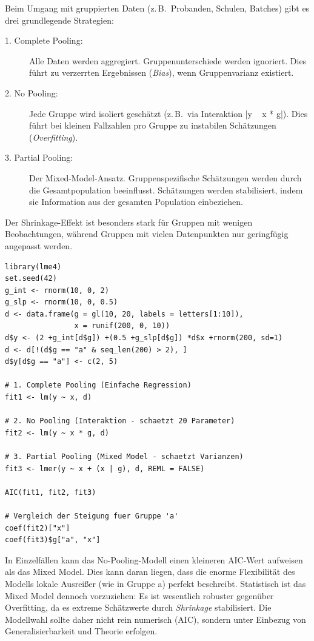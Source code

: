 \documentclass[10pt,twocolumn]{scrartcl}
\renewcommand{\lstinline}{\mycoloredinline}
\begin{document}
Beim Umgang mit gruppierten Daten (z.\,B.\ Probanden, Schulen, Batches) gibt es drei grundlegende Strategien:

\begin{description}
\item[1. Complete Pooling:] Alle Daten werden aggregiert. Gruppenunterschiede werden ignoriert. Dies führt zu verzerrten Ergebnissen (\emph{Bias}), wenn Gruppenvarianz existiert.
\item[2. No Pooling:] Jede Gruppe wird isoliert geschätzt (z.\,B.\ via Interaktion \lstinline|y ~ x * g|). Dies führt bei kleinen Fallzahlen pro Gruppe zu instabilen Schätzungen (\emph{Overfitting}).
\item[3. Partial Pooling:] Der Mixed-Model-Ansatz. Gruppenspezifische Schätzungen werden durch die Gesamtpopulation beeinflusst. Schätzungen werden stabilisiert, indem sie Information aus der gesamten Population einbeziehen.
\end{description}

Der Shrinkage-Effekt ist besonders stark für Gruppen mit wenigen Beobachtungen, während Gruppen mit vielen Datenpunkten nur geringfügig angepasst werden.

\begin{lstlisting}
library(lme4)
set.seed(42)
g_int <- rnorm(10, 0, 2)
g_slp <- rnorm(10, 0, 0.5)
d <- data.frame(g = gl(10, 20, labels = letters[1:10]), 
                x = runif(200, 0, 10))
d$y <- (2 +g_int[d$g]) +(0.5 +g_slp[d$g]) *d$x +rnorm(200, sd=1)
d <- d[!(d$g == "a" & seq_len(200) > 2), ]
d$y[d$g == "a"] <- c(2, 5)

# 1. Complete Pooling (Einfache Regression)
fit1 <- lm(y ~ x, d)

# 2. No Pooling (Interaktion - schaetzt 20 Parameter)
fit2 <- lm(y ~ x * g, d)

# 3. Partial Pooling (Mixed Model - schaetzt Varianzen)
fit3 <- lmer(y ~ x + (x | g), d, REML = FALSE)

AIC(fit1, fit2, fit3)

# Vergleich der Steigung fuer Gruppe 'a'
coef(fit2)["x"]
coef(fit3)$g["a", "x"]
\end{lstlisting}

In Einzelfällen kann das No-Pooling-Modell einen kleineren AIC-Wert aufweisen als das Mixed Model. Dies kann daran liegen, dass die enorme Flexibilität des Modells lokale Ausreißer (wie in Gruppe a) perfekt beschreibt. Statistisch ist das Mixed Model dennoch vorzuziehen: Es ist wesentlich robuster gegenüber Overfitting, da es extreme Schätzwerte durch \emph{Shrinkage} stabilisiert. Die Modellwahl sollte daher nicht rein numerisch (AIC), sondern unter Einbezug von Generalisierbarkeit und Theorie erfolgen.
\end{document}
